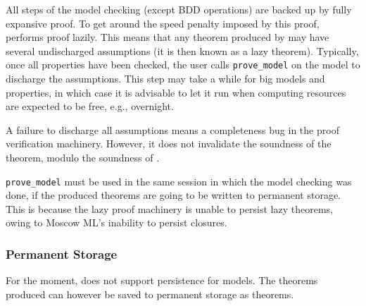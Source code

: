 All steps of the model checking (except BDD operations) are backed up by fully expansive proof. To get around the speed penalty imposed by this proof, \hc{} performs proof lazily. This means that any theorem produced by \hc{} may have several undischarged assumptions (it is then known as a lazy theorem). Typically, once all properties have been checked, the user calls \texttt{prove\_model} on the model to discharge the assumptions. This step may take a while for big models and properties, in which case it is advisable to let it run when computing resources are expected to be free, e.g., overnight.

A failure to discharge all assumptions means a completeness bug in the \hc{} proof verification machinery. However, it does not invalidate the soundness of the theorem, modulo the soundness of \HOL{}.

\texttt{prove\_model} must be used in the same session in which the model checking was done, if the produced theorems are going to be written to permanent storage. This is because the lazy proof machinery is unable to persist lazy theorems, owing to Moscow ML's inability to persist closures.

\subsubsection{Permanent Storage}

For the moment, \hc{} does not support persistence for models. The theorems produced can however be saved to permanent storage as \HOL{} theorems.


